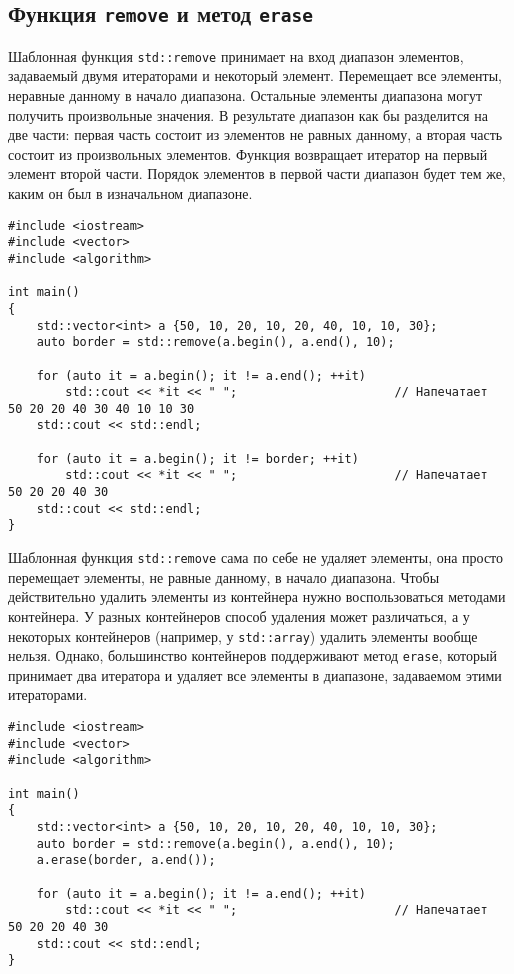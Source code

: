 \documentclass{article}
\begin{document}
\subsection*{Функция \texttt{remove} и метод \texttt{erase}}
Шаблонная функция \texttt{std::remove} принимает на вход диапазон элементов, задаваемый двумя итераторами и некоторый элемент. Перемещает все элементы, неравные данному в начало диапазона. Остальные элементы диапазона могут получить произвольные значения. В результате диапазон как бы разделится на две части: первая часть состоит из элементов не равных данному, а вторая часть состоит из произвольных элементов. Функция возвращает итератор на первый элемент второй части. Порядок элементов в первой части диапазон будет тем же, каким он был в изначальном диапазоне.
\begin{lstlisting}
#include <iostream>
#include <vector>
#include <algorithm>

int main()
{
    std::vector<int> a {50, 10, 20, 10, 20, 40, 10, 10, 30};
    auto border = std::remove(a.begin(), a.end(), 10);
    
    for (auto it = a.begin(); it != a.end(); ++it)    
    	std::cout << *it << " ";                      // Напечатает  50 20 20 40 30 40 10 10 30
    std::cout << std::endl;
    
    for (auto it = a.begin(); it != border; ++it)       
    	std::cout << *it << " ";                      // Напечатает  50 20 20 40 30
    std::cout << std::endl;
}
\end{lstlisting}
Шаблонная функция \texttt{std::remove} сама по себе не удаляет элементы, она просто перемещает элементы, не равные данному, в начало диапазона. Чтобы действительно удалить элементы из контейнера нужно воспользоваться методами контейнера. У разных контейнеров способ удаления может различаться, а у некоторых контейнеров (например, у \texttt{std::array}) удалить элементы вообще нельзя. Однако, большинство контейнеров поддерживают метод \texttt{erase}, который принимает два итератора и удаляет все элементы в диапазоне, задаваемом этими итераторами.

\begin{lstlisting}
#include <iostream>
#include <vector>
#include <algorithm>

int main()
{
    std::vector<int> a {50, 10, 20, 10, 20, 40, 10, 10, 30};
    auto border = std::remove(a.begin(), a.end(), 10);
    a.erase(border, a.end());
    
    for (auto it = a.begin(); it != a.end(); ++it)    
    	std::cout << *it << " ";                      // Напечатает  50 20 20 40 30
    std::cout << std::endl;
}
\end{lstlisting}
\end{document}
